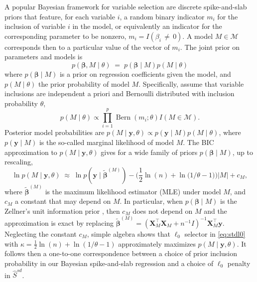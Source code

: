 \documentclass[
  12pt]{article}
\newcommand{\M}{\mathcal{M}}
\newcommand{\by}{\mathbf{y}}
\newcommand{\bbeta}{\boldsymbol{\beta}}
\newcommand{\bX}{\mathbf{X}}
\begin{document}
A popular Bayesian framework for variable selection are discrete spike-and-slab priors that feature, for each variable $i$, a random binary indicator $m_i$ for the inclusion of variable $i$ in the model, or equivalently an indicator for the corresponding parameter to be nonzero, $m_i=I(\beta_i\,\neq\,0)$. A model $M \in \M$ corresponds then to a particular value of the vector of $m_i$. The joint prior on parameters and models is 
\begin{equation}\label{eq:bayesianframework}
    p(\bbeta,M \mid \theta)\;=\;p( \bbeta \mid  M) p(M \mid \theta)
\end{equation}
where $p( \bbeta \mid  M)$ is a prior on regression coefficients given the model, and 
$p(M \mid \theta)$ the prior probability of model $M$. Specifically, assume that variable inclusions are independent a priori and Bernoulli distributed with inclusion probability $\theta$,
\begin{equation} \label{eq:modelprior}
p( M \mid \theta) \propto
        \prod_{i=1}^p \operatorname{Bern}\left(m_i ; \theta\right) I(M \in \M).
\end{equation}
Posterior model probabilities are $p(M \mid \by, \theta) \propto p(\by \mid M) p(M \mid \theta)$, where $p(\by \mid M)$ is the so-called marginal likelihood of model $M$. The BIC approximation \citep{BIC} to $p(M\mid \by, \theta)$ gives for a wide family of priors $p(\bbeta \mid M)$, up to rescaling,
\begin{equation}\label{eq:dfbapon}
\ln p(M \mid\by, \theta) \;\approx\; \ln p(\by \mid \tilde{\bbeta}^{(M)}) - \Big(\frac{1}{2}\ln(n) + \ln \big(1/\theta-1\big)\Big)|M| + c_M,
\end{equation}
where $\tilde{\bbeta}^{(M)}$ is the maximum likelihood estimator (MLE) under model $M$, and $c_M$ a constant that may depend on $M$.
In particular, when $p(\bbeta \mid M)$ is the Zellner's unit information prior \citep{zellner1986assessing}, then $c_M$ does not depend on $M$ and the approximation is exact by replacing $\tilde{\bbeta}^{(M)}= (\bX_M^\top \bX_M + n^{-1} I)^{-1} \bX_M^\top \by$.
Neglecting the constant $c_M$, simple algebra shows that $\ell_0$ selector in \ref{eq:stdl0} with $\kappa = \frac12 \ln(n) + \ln(1/\theta − 1)$ approximately maximizes $p(M \mid \by, \theta)$. It follows then a one-to-one correspondence between a choice of prior inclusion probability in our Bayesian spike-and-slab regression and a choice of $\ell_0$ penalty in $\hat{S}^{sd}$.
\end{document}

